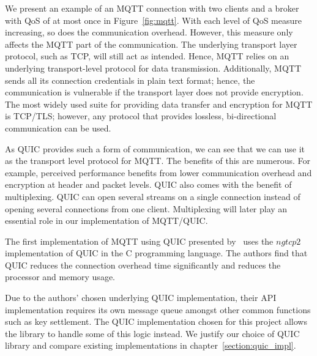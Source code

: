 We present an example of an MQTT connection with two clients and a broker with QoS of at most once in Figure~\ref{fig:mqtt}.
With each level of QoS measure increasing, so does the communication overhead.
However, this measure only affects the MQTT part of the communication.
The underlying transport layer protocol, such as TCP, will still act as intended.
Hence, MQTT relies on an underlying transport-level protocol for data transmission.
Additionally, MQTT sends all its connection credentials in plain text format; hence, the communication is vulnerable if the transport layer does not provide encryption.
The most widely used suite for providing data transfer and encryption for MQTT is TCP/TLS; however, any protocol that provides lossless, bi-directional communication can be used.

As QUIC provides such a form of communication, we can see that we can use it as the transport level protocol for MQTT.
The benefits of this are numerous. 
For example, perceived performance benefits from lower communication overhead and encryption at header and packet levels.
QUIC also comes with the benefit of multiplexing.
QUIC can open several streams on a single connection instead of opening several connections from one client.
Multiplexing will later play an essential role in our implementation of MQTT/QUIC.

The first implementation of MQTT using QUIC presented by~\cite{kumar_implementation_2019} uses the $ngtcp2$ implementation of QUIC in the C programming language.
The authors find that QUIC reduces the connection overhead time significantly and reduces the processor and memory usage.

Due to the authors' chosen underlying QUIC implementation, their API implementation requires its own message queue amongst other common functions such as key settlement.
The QUIC implementation chosen for this project allows the library to handle some of this logic instead.
We justify our choice of QUIC library and compare existing implementations in chapter~\ref{section:quic_impl}.
